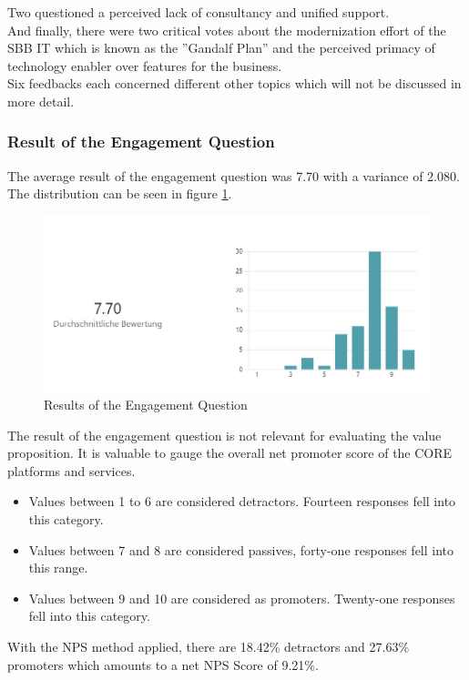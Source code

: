 \documentclass[a4paper,12pt]{article}
\begin{document}
    Two questioned a perceived lack of consultancy and unified support.\\
    And finally, there were two critical votes about the modernization effort of the SBB IT which is known as the
    ''Gandalf Plan'' and the perceived primacy of technology enabler over features for the business.\\
    Six feedbacks each concerned different other topics which will not be discussed in more detail.

    \subsubsection{Result of the Engagement Question}
    \label{sssec:rengque}
    The average result of the engagement question was 7.70 with a variance of 2.080.
    The distribution can be seen in figure \ref{fig:engque}.
    \begin{figure}
        \includegraphics[width=\linewidth]{engagement.PNG}
        \caption{Results of the Engagement Question}
        \label{fig:engque}
    \end{figure}
    The result of the engagement question is not relevant for evaluating the value proposition.
    It is valuable to gauge the overall net promoter score\parencite{nps} of the CORE platforms and services.
    \begin{itemize}
        \item Values between 1 to 6 are considered detractors. Fourteen responses fell into this category.
        \item Values between 7 and 8 are considered passives, forty-one responses fell into this range.
        \item Values between 9 and 10 are considered as promoters. Twenty-one responses fell into this category.
    \end{itemize}
    With the NPS method applied, there are 18.42\% detractors and 27.63\% promoters which amounts to a net NPS Score of
    9.21\%.
\end{document}
